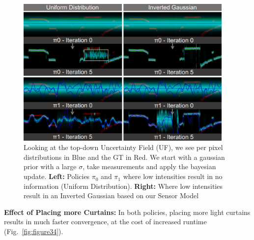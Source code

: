  \begin{figure}[h]
    \centering
    \begin{minipage}{0.5\textwidth}
        \centering
        \includegraphics[width=0.95\textwidth]{figures/combined2.png}
    \end{minipage}\hfill
    \centering
    \caption{Looking at the top-down Uncertainty Field (UF), we see per pixel distributions in Blue and the GT in Red. We start with a gaussian prior with a large $\sigma$, take measurements and apply the bayesian update. \textbf{Left:} Policies $\pi_{0}$ and $\pi_{1}$ where low intensities result in no information (Uniform Distribution). \textbf{Right:} Where low intensities result in an Inverted Gaussian based on our Sensor Model}
    \label{fig:invgau} 
\end{figure}

 \textbf{Effect of Placing more Curtains:} In both policies, placing more light curtains results in much faster convergence, at the cost of increased runtime (Fig.~\ref{fig:figure34}).

